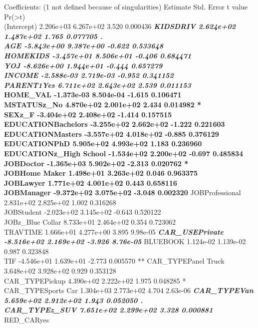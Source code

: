 \documentclass[]{article}
\begin{document}
Coefficients: (1 not defined because of singularities) Estimate Std.
Error t value Pr(\textgreater{}\textbar{}t\textbar{})\\
(Intercept) 2.206e+03 6.267e+02 3.520 0.000436 \textbf{\emph{ KIDSDRIV
2.624e+02 1.487e+02 1.765 0.077705 .\\
AGE -5.843e+00 9.387e+00 -0.622 0.533648\\
HOMEKIDS -3.457e+01 8.506e+01 -0.406 0.684471\\
YOJ -8.626e+00 1.944e+01 -0.444 0.657279\\
INCOME -2.588e-03 2.719e-03 -0.952 0.341152\\
PARENT1Yes 6.711e+02 2.643e+02 2.539 0.011153 }\\
HOME\_VAL -1.373e-03 8.504e-04 -1.615 0.106471\\
MSTATUSz\_No 4.870e+02 2.001e+02 2.434 0.014982 *\\
SEXz\_F -3.404e+02 2.408e+02 -1.414 0.157515\\
EDUCATIONBachelors -3.255e+02 2.662e+02 -1.222 0.221603\\
EDUCATIONMasters -3.557e+02 4.018e+02 -0.885 0.376129\\
EDUCATIONPhD 5.905e+02 4.993e+02 1.183 0.236960\\
EDUCATIONz\_High School -1.534e+02 2.200e+02 -0.697 0.485834\\
JOBDoctor -1.365e+03 5.902e+02 -2.313 0.020762 *\\
JOBHome Maker 1.498e+01 3.263e+02 0.046 0.963375\\
JOBLawyer 1.771e+02 4.001e+02 0.443 0.658116\\
JOBManager -9.372e+02 3.075e+02 -3.048 0.002320 } JOBProfessional
2.831e+02 2.825e+02 1.002 0.316268\\
JOBStudent -2.023e+02 3.145e+02 -0.643 0.520122\\
JOBz\_Blue Collar 8.733e+01 2.464e+02 0.354 0.723062\\
TRAVTIME 1.666e+01 4.277e+00 3.895 9.98e-05 \textbf{\emph{
CAR\_USEPrivate -8.516e+02 2.169e+02 -3.926 8.76e-05 }} BLUEBOOK
1.124e-02 1.139e-02 0.987 0.323848\\
TIF -4.546e+01 1.639e+01 -2.773 0.005570 ** CAR\_TYPEPanel Truck
3.648e+02 3.928e+02 0.929 0.353128\\
CAR\_TYPEPickup 4.390e+02 2.222e+02 1.975 0.048285 *\\
CAR\_TYPESports Car 1.304e+03 2.773e+02 4.704 2.63e-06 \textbf{\emph{
CAR\_TYPEVan 5.659e+02 2.912e+02 1.943 0.052050 .\\
CAR\_TYPEz\_SUV 7.651e+02 2.299e+02 3.328 0.000881 }} RED\_CARyes
\end{document}
